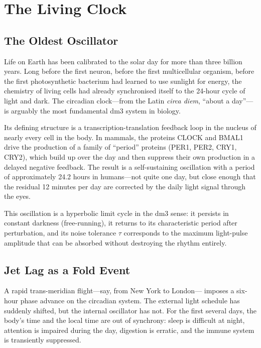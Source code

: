 \documentclass[12pt, oneside]{book}
\theoremstyle{plain}
\theoremstyle{definition}
\theoremstyle{remark}
\begin{document}
\chapter{The Living Clock}
\label{ch:circadian}

\section{The Oldest Oscillator}

Life on Earth has been calibrated to the solar day for more than
three billion years. Long before the first neuron, before the
first multicellular organism, before the first photosynthetic
bacterium had learned to use sunlight for energy, the chemistry
of living cells had already synchronised itself to the 24-hour
cycle of light and dark. The circadian clock---from the Latin
\emph{circa diem}, ``about a day''---is arguably the most
fundamental dm3 system in biology.

Its defining structure is a transcription-translation feedback
loop in the nucleus of nearly every cell in the body. In mammals,
the proteins CLOCK and BMAL1 drive the production of a family
of ``period'' proteins (PER1, PER2, CRY1, CRY2), which build
up over the day and then suppress their own production in a
delayed negative feedback. The result is a self-sustaining
oscillation with a period of approximately 24.2 hours in
humans---not quite one day, but close enough that the residual
12 minutes per day are corrected by the daily light signal through
the eyes.

This oscillation is a hyperbolic limit cycle in the dm3 sense:
it persists in constant darkness (free-running), it returns
to its characteristic period after perturbation, and its noise
tolerance $\tau$ corresponds to the maximum light-pulse amplitude
that can be absorbed without destroying the rhythm entirely.

\section{Jet Lag as a Fold Event}

A rapid trans-meridian flight---say, from New York to London---
imposes a six-hour phase advance on the circadian system. The
external light schedule has suddenly shifted, but the internal
oscillator has not. For the first several days, the body's
time and the local time are out of synchrony: sleep is difficult
at night, attention is impaired during the day, digestion is
erratic, and the immune system is transiently suppressed.
\end{document}
